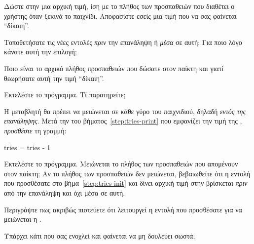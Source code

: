 \documentclass[a4paper,11pt,oneside]{book}
\begin{document}
\begin{step}
\label{step:tries-init}
Δώστε στην  μια αρχική τιμή, ίση με το πλήθος των προσπαθειών που διαθέτει ο χρήστης όταν ξεκινά το παιχνίδι. Αποφασίστε εσείς μια τιμή που να σας φαίνεται ``δίκαιη''.

Τοποθετήσατε τις νέες εντολές \emph{πριν} την επανάληψη ή \emph{μέσα} σε αυτή; Για ποιο λόγο κάνατε αυτή την επιλογή;

\marginnote[14pt]{\icondiscuss}
\dottedline

\dottedline

Ποιο είναι το αρχικό πλήθος προσπαθειών που δώσατε στον παίκτη και γιατί θεωρήσατε αυτή την τιμή ``δίκαιη''.

\marginnote[14pt]{\icondiscuss}
\dottedline

\dottedline

Εκτελέστε το πρόγραμμα. Τί παρατηρείτε;

\marginnote[14pt]{\icondiscuss}
\dottedline
\end{step}

\begin{step}
Η μεταβλητή  θα πρέπει να μειώνεται σε κάθε γύρο του παιχνιδιού, δηλαδή \emph{εντός της επανάληψης}. Μετά την  του βήματος~\ref{step:tries-print} που εμφανίζει την τιμή της , \emph{προσθέστε} τη γραμμή:

\begin{pynew}
    tries = tries - 1
\end{pynew}

Εκτελέστε το πρόγραμμα. Μειώνεται το πλήθος των προσπαθειών που απομένουν στον παίκτη;
\marginnote[14pt]{\iconcaution}
Αν το πλήθος των προσπαθειών δεν μειώνεται, βεβαιωθείτε ότι η εντολή που προσθέσατε στο βήμα~\ref{step:tries-init} και δίνει αρχική τιμή στην  βρίσκεται \emph{πριν} από την επανάληψη και όχι μέσα σε αυτή.

Περιγράψτε πως ακριβώς πιστεύετε ότι λειτουργεί η εντολή που προσθέσατε για να μειώνεται η .

\marginnote[14pt]{\icondiscuss}
\dottedline

\dottedline

\dottedline


Υπάρχει κάτι που σας ενοχλεί και φαίνεται να μη δουλεύει σωστά;

\marginnote[14pt]{\icondiscuss}
\dottedline
\end{step}
 
\end{document}
